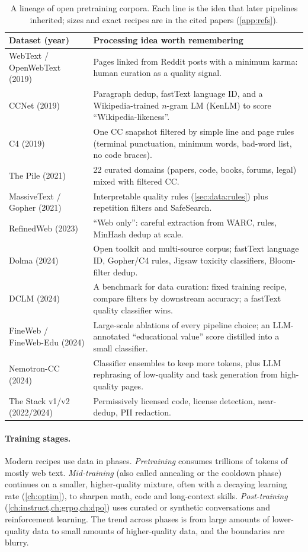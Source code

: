 \begin{table}[t]
\centering\small
\begin{tabularx}{\linewidth}{@{}lX@{}}
\toprule
\textbf{Dataset (year)} & \textbf{Processing idea worth remembering}\\
\midrule
WebText / OpenWebText (2019) & Pages linked from Reddit posts with a minimum karma: human curation as a quality signal.\\
CCNet (2019) & Paragraph dedup, fastText language ID, and a Wikipedia-trained $n$-gram LM (KenLM) to score ``Wikipedia-likeness''.\\
C4 (2019) & One CC snapshot filtered by simple line and page rules (terminal punctuation, minimum words, bad-word list, no code braces).\\
The Pile (2021) & 22 curated domains (papers, code, books, forums, legal) mixed with filtered CC.\\
MassiveText / Gopher (2021) & Interpretable quality rules (\cref{sec:data:rules}) plus repetition filters and SafeSearch.\\
RefinedWeb (2023) & ``Web only'': careful extraction from WARC, rules, MinHash dedup at scale.\\
Dolma (2024) & Open toolkit and multi-source corpus; fastText language ID, Gopher/C4 rules, Jigsaw toxicity classifiers, Bloom-filter dedup.\\
DCLM (2024) & A benchmark for data curation: fixed training recipe, compare filters by downstream accuracy; a fastText quality classifier wins.\\
FineWeb / FineWeb-Edu (2024) & Large-scale ablations of every pipeline choice; an LLM-annotated ``educational value'' score distilled into a small classifier.\\
Nemotron-CC (2024) & Classifier ensembles to keep more tokens, plus LLM rephrasing of low-quality and task generation from high-quality pages.\\
The Stack v1/v2 (2022/2024) & Permissively licensed code, license detection, near-dedup, PII redaction.\\
\bottomrule
\end{tabularx}
\caption{A lineage of open pretraining corpora. Each line is the idea that later pipelines
inherited; sizes and exact recipes are in the cited papers (\cref{app:refs}).}
\label{tab:data:lineage}
\end{table}

\paragraph{Training stages.} Modern recipes use data in phases. \emph{Pretraining} consumes
trillions of tokens of mostly web text. \emph{Mid-training} (also called annealing or the cooldown phase) continues on a smaller, higher-quality mixture,
often with a decaying learning rate (\cref{ch:optim}), to sharpen math, code and long-context
skills. \emph{Post-training} (\cref{ch:instruct,ch:grpo,ch:dpo}) uses curated or synthetic
conversations and reinforcement learning. The trend across phases is from large amounts of
lower-quality data to small amounts of higher-quality data, and the boundaries are blurry.

